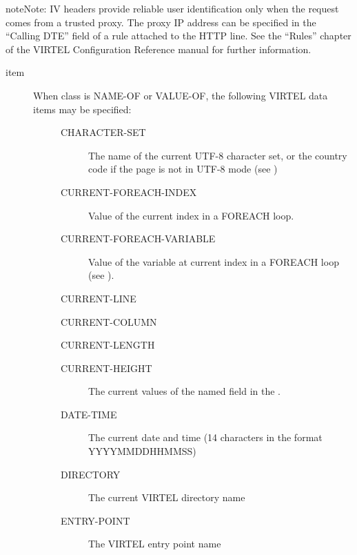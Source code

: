 \documentclass[letterpaper,10pt,english]{sphinxmanual}
\begin{document}
\begin{sphinxadmonition}{note}{Note:}
IV headers provide reliable user identification only when the request comes from a trusted proxy. The proxy IP address can be specified in the “Calling DTE” field of a rule attached to the HTTP line. See the “Rules” chapter of the VIRTEL Configuration Reference manual for further information.
\end{sphinxadmonition}
\begin{description}
\item[{item}] \leavevmode\begin{description}
\item[{When class is NAME-OF or VALUE-OF, the following VIRTEL data items may be specified:}] \leavevmode\begin{description}
\item[{CHARACTER-SET}] \leavevmode
The name of the current UTF-8 character set, or the country code if the page is not in UTF-8 mode (see {\hyperref[\detokenize{User_Guide:v457ug-ebcdic-translation}]{}})

\item[{CURRENT-FOREACH-INDEX}] \leavevmode
Value of the current index in a FOREACH loop.

\item[{CURRENT-FOREACH-VARIABLE}] \leavevmode
Value of the variable at current index in a FOREACH loop (see {\hyperref[\detokenize{User_Guide:v457ug-foreach-variable}]{}}).

\end{description}

CURRENT-LINE

CURRENT-COLUMN

CURRENT-LENGTH
\begin{description}
\item[{CURRENT-HEIGHT}] \leavevmode
The current values of the named field in the {\hyperref[\detokenize{User_Guide:v457ug-set-screen-position}]{}}.

\item[{DATE-TIME}] \leavevmode
The current date and time (14 characters in the format YYYYMMDDHHMMSS)

\item[{DIRECTORY}] \leavevmode
The current VIRTEL directory name

\item[{ENTRY-POINT}] \leavevmode
The VIRTEL entry point name


\end{description}
\end{description}
\end{description}
\end{document}
